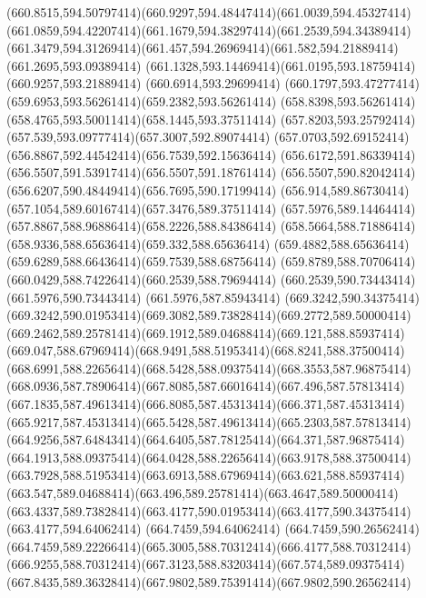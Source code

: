 {{	\curveto(660.8515,594.50797414)(660.9297,594.48447414)(661.0039,594.45327414)
	\curveto(661.0859,594.42207414)(661.1679,594.38297414)(661.2539,594.34389414)
	\curveto(661.3479,594.31269414)(661.457,594.26969414)(661.582,594.21889414)
	\lineto(661.2695,593.09389414)
	\curveto(661.1328,593.14469414)(661.0195,593.18759414)(660.9257,593.21889414)
	\lineto(660.6914,593.29699414)
	\curveto(660.1797,593.47277414)(659.6953,593.56261414)(659.2382,593.56261414)
	\curveto(658.8398,593.56261414)(658.4765,593.50011414)(658.1445,593.37511414)
	\curveto(657.8203,593.25792414)(657.539,593.09777414)(657.3007,592.89074414)
	\curveto(657.0703,592.69152414)(656.8867,592.44542414)(656.7539,592.15636414)
	\curveto(656.6172,591.86339414)(656.5507,591.53917414)(656.5507,591.18761414)
	\curveto(656.5507,590.82042414)(656.6207,590.48449414)(656.7695,590.17199414)
	\curveto(656.914,589.86730414)(657.1054,589.60167414)(657.3476,589.37511414)
	\curveto(657.5976,589.14464414)(657.8867,588.96886414)(658.2226,588.84386414)
	\curveto(658.5664,588.71886414)(658.9336,588.65636414)(659.332,588.65636414)
	\curveto(659.4882,588.65636414)(659.6289,588.66436414)(659.7539,588.68756414)
	\curveto(659.8789,588.70706414)(660.0429,588.74226414)(660.2539,588.79694414)
	\lineto(660.2539,590.73443414)
	\lineto(661.5976,590.73443414)
	\lineto(661.5976,587.85943414)
	\closepath
	\moveto(669.3242,590.34375414)
	\curveto(669.3242,590.01953414)(669.3082,589.73828414)(669.2772,589.50000414)
	\curveto(669.2462,589.25781414)(669.1912,589.04688414)(669.121,588.85937414)
	\curveto(669.047,588.67969414)(668.9491,588.51953414)(668.8241,588.37500414)
	\curveto(668.6991,588.22656414)(668.5428,588.09375414)(668.3553,587.96875414)
	\curveto(668.0936,587.78906414)(667.8085,587.66016414)(667.496,587.57813414)
	\curveto(667.1835,587.49613414)(666.8085,587.45313414)(666.371,587.45313414)
	\curveto(665.9217,587.45313414)(665.5428,587.49613414)(665.2303,587.57813414)
	\curveto(664.9256,587.64843414)(664.6405,587.78125414)(664.371,587.96875414)
	\curveto(664.1913,588.09375414)(664.0428,588.22656414)(663.9178,588.37500414)
	\curveto(663.7928,588.51953414)(663.6913,588.67969414)(663.621,588.85937414)
	\curveto(663.547,589.04688414)(663.496,589.25781414)(663.4647,589.50000414)
	\curveto(663.4337,589.73828414)(663.4177,590.01953414)(663.4177,590.34375414)
	\lineto(663.4177,594.64062414)
	\lineto(664.7459,594.64062414)
	\lineto(664.7459,590.26562414)
	\curveto(664.7459,589.22266414)(665.3005,588.70312414)(666.4177,588.70312414)
	\curveto(666.9255,588.70312414)(667.3123,588.83203414)(667.574,589.09375414)
	\curveto(667.8435,589.36328414)(667.9802,589.75391414)(667.9802,590.26562414)
}}
